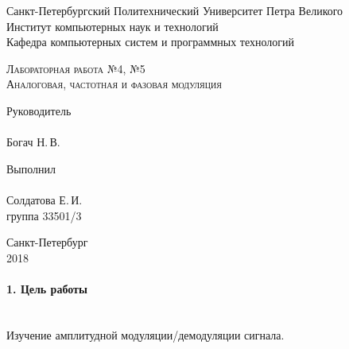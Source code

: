 \documentclass[12pt,a4paper]{report}
\begin{document}
\begin{titlepage}
\newpage
  \begin{center}
     
    Санкт-Петербургский Политехнический Университет Петра Великого \\
    
    Институт компьютерных наук и технологий \\
    
    Кафедра компьютерных систем и программных технологий
    \end{center}
    
    \vspace{15em}
    \begin{center}
    \textsc{Лабораторная работа №4, №5}\\
    \vspace{5mm}
    \textsc{Аналоговая, частотная и фазовая модуляция}
    	
   \end{center}
\vspace{10em}

\newlength{\ML}
\hfill\begin{minipage}{0.45\textwidth}
\vfill
  Руководитель \\
  \\
  \underline{\hspace{\ML}} Богач Н.\,В.\\
 
\end{minipage}%
\bigskip

\hfill\begin{minipage}{0.45\textwidth}
  Выполнил\\
  \\
  \underline{\hspace{\ML}} Солдатова Е.\,И.\\
  группа 33501/3
\end{minipage}%

\vspace{\fill}
\begin{center}
    
  Санкт-Петербург\\
   2018 
\end{center}
\end{titlepage}

\paragraph{1. Цель работы\\\\}
Изучение амплитудной модуляции/демодуляции сигнала.
\end{document}
